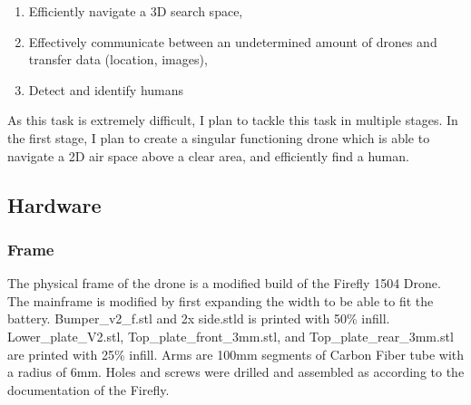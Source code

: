 \documentclass{article}
\begin{document}
\begin{enumerate}
  \item Efficiently navigate a 3D search space,
  \item Effectively communicate between an undetermined amount of drones and transfer data (location, images),
  \item Detect and identify humans
\end{enumerate}

As this task is extremely difficult, I plan to tackle this task in multiple stages. In the first stage, I plan to create a singular functioning drone which is able to navigate a 2D air space above a clear area, and efficiently find a human. 

\subsection{Hardware}
\subsubsection{Frame}
The physical frame of the drone is a modified build of the Firefly 1504 Drone. The mainframe is modified by first expanding the width to be able to fit the battery. Bumper\_v2\_f.stl and 2x side.stld is printed with 50\% infill. Lower\_plate\_V2.stl, Top\_plate\_front\_3mm.stl, and Top\_plate\_rear\_3mm.stl are printed with 25\% infill. Arms are 100mm segments of Carbon Fiber tube with a radius of 6mm. Holes and screws were drilled and assembled as according to the documentation of the Firefly.
\end{document}
